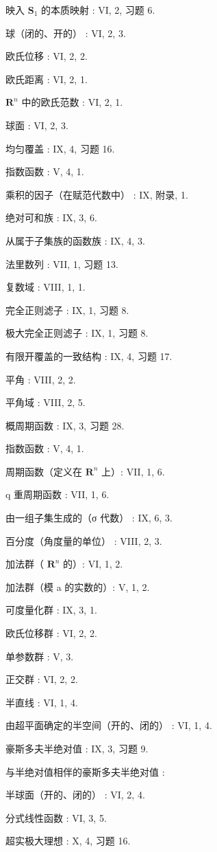 映入 \(\mathbf{S}_1\) 的本质映射 : VI, 2, 习题 6.

球（闭的、开的） : VI, 2, 3.

欧氏位移 : VI, 2, 2.

欧氏距离 : VI, 2, 1.

\(\mathbf{R}^n\) 中的欧氏范数 : VI, 2, 1.

球面 : VI, 2, 3.

均匀覆盖 : IX, 4, 习题 16.

指数函数 : V, 4, 1.

乘积的因子（在赋范代数中） : IX, 附录, 1.

绝对可和族 : IX, 3, 6.

从属于子集族的函数族 : IX, 4, 3.

法里数列 : VII, 1, 习题 13.

复数域 : VIII, 1, 1.

完全正则滤子 : IX, 1, 习题 8.

极大完全正则滤子 : IX, 1, 习题 8.

有限开覆盖的一致结构 : IX, 4, 习题 17.

平角 : VIII, 2, 2.

平角域 : VIII, 2, 5.

概周期函数 : IX, 3, 习题 28.

指数函数 : V, 4, 1.

周期函数（定义在 \(\mathbf{R}^n\) 上）: VII, 1, 6.

q 重周期函数 : VII, 1, 6.

由一组子集生成的（σ 代数） : IX, 6, 3.

百分度（角度量的单位） : VIII, 2, 3.

加法群（ \(\mathbf{R}^n\) 的）: VI, 1, 2.

加法群（模 a 的实数的）: V, 1, 2.

可度量化群 : IX, 3, 1.

欧氏位移群 : VI, 2, 2.

单参数群 : V, 3.

正交群 : VI, 2, 2.

半直线 : VI, 1, 4.

由超平面确定的半空间（开的、闭的） : VI, 1, 4.

豪斯多夫半绝对值 : IX, 3, 习题 9.

与半绝对值相伴的豪斯多夫半绝对值 :

半球面（开的、闭的） : VI, 2, 4.

分式线性函数 : VI, 3, 5.

超实极大理想 : X, 4, 习题 16.

